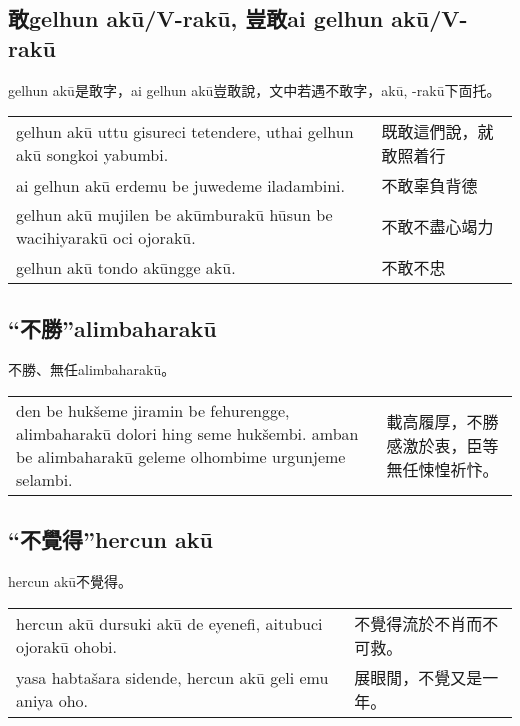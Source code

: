 \documentclass{article}
\begin{document}
\subsection{敢gelhun ak\={u}/V-rak\={u}, 豈敢ai gelhun ak\={u}/V-rak\={u}}
\noindent gelhun ak\={u}是敢字，ai gelhun ak\={u}豈敢說，文中若遇不敢字，ak\={u}, -rak\={u}下靣托。
\begin{center}
    \begin{tabularx}{\textwidth}{XX}
        gelhun ak\={u} uttu gisureci tetendere, uthai gelhun ak\={u} songkoi yabumbi. & 既敢這們說，就敢照着行\\
        ai gelhun ak\={u} erdemu be juwedeme iladambini. & 不敢辜負背德\\
        gelhun ak\={u} mujilen be ak\={u}mburak\={u} h\={u}sun be wacihiyarak\={u} oci ojorak\={u}. & 不敢不盡心竭力\\
        gelhun ak\={u} tondo ak\={u}ngge ak\={u}. & 不敢不忠
    \end{tabularx}
\end{center}

\subsection{“不勝”alimbaharak\={u}}
\noindent 不勝、無任alimbaharak\={u}。
\begin{center}
    \begin{tabularx}{\textwidth}{XX}
        den be huk\v{s}eme jiramin be fehurengge, alimbaharak\={u} dolori hing seme huk\v{s}embi. amban be alimbaharak\={u} geleme olhombime urgunjeme selambi. & 載高履厚，不勝感激於衷，臣等無任悚惶祈忭。
    \end{tabularx}
\end{center}

\subsection{“不覺得”hercun ak\={u}}
\noindent hercun ak\={u}不覺得。
\begin{center}
    \begin{tabularx}{\textwidth}{XX}
        hercun ak\={u} dursuki ak\={u} de eyenefi, aitubuci ojorak\={u} ohobi. & 不覺得流於不肖而不可救。\\
        yasa habta\v{s}ara sidende, hercun ak\={u} geli emu aniya oho. & 展眼閒，不覺又是一年。
    \end{tabularx}
\end{center}
\end{document}
